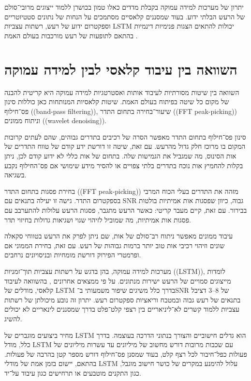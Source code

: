 יתרון של מערכות למידה עמוקה בקבלת מדדים כאלו טמון בכושרן ללמוד ייצוגים מרובי־סולם של הרעש הבלתי ידוע. בעוד שמסננים קלאסיים מסתמכים על הנחות של נתונים סטטיוטריים וספקטרום ידוע של רעש, רשתות עצביות \textenglish{LSTM} יכולות להתאים הצגות פנימיות דינמיות בהתאם לתופעות של רעש מורכבות בעולם האמת \cite{nachmani2020voice}.

\section{השוואה בין עיבוד קלאסי לבין למידה עמוקה}

השוואה בין שיטות מסורתיות לעיבוד אותות ואסטרטגיות למידה עמוקה היא קריטית להבנה של מקום כל שיטה בפיתוח בעולם האמת. שיטות קלאסיות המנותחות כאן כוללות סינון פס־חילוף ((\textenglish{band-pass filtering})), שיעור־בחירה בתחום התדר ((\textenglish{FFT peak-picking})) וניתוח ממונים ((\textenglish{wavelet denoising})).

סינון פס־חילוף בתחום התדר מאפשר הסרה של רכיבים בתדרים גבוהים, שהם לעתים קרובות המקום בו מרוכז חלק גדול מהרעש. עם זאת, שיטה זו דורשת ידע קודם של טווח התדרים של אות הסינוס, מה שמגביל את הגמישות שלה. בתחום של אות כללי לא ידוע קודם לכן, ניתן בקלות להחמיץ אות נוכח בתדרים בלתי צפויים או להסיר מידע שימושי אם פס־החילוף נקבע בשגיאה.

בחירת פסגות בתחום התדר ((\textenglish{FFT peak-picking})) מזהה את התדרים בעלי הכוח המרבי בספקטרום התדר. גישה זו יעילה בתנאים עם \textenglish{SNR} גבוה, כיוון שפסגות אות אמיתיות בולטות בבירור. עם זאת, קיים מעבר קריטי: כאשר הרעש מתגבר, פסגות הרעש עלולות להתערבב עם פסגות אות אמיתיות, מה שמוביל לזיהוי שגוי ושגיאות גדולות בחיזוי תדר.

עיבוד ממונים מאפשר ניתוח רב־סולם של אות, שם ניתן לפרק את הרעש בטווחי סקאלה שונים וזיהוי רכיבי אות טוב יותר ברמות גבוהות של רעש. עם זאת, בחירת הממוני אם ופרמטרי הפירוק דורשת מומחיות ובניסויונים נרחבים.

מערכות למידה עמוקה, בהן בדגש על רשתות עצביות תוך־זמניות ((\textenglish{LSTM})), לומדות מייצוגים סמויים של הרעש ישירות מנתונים. על פי ממצאים אחרונים \cite{tzinis2020universal}, בהשוואה לעיבוד קלאסי, מודלים של \textenglish{LSTM} בדרך כלל משיגים שיפור משמעותי ב־\textenglish{SNR} של $3\text{--}8$ דציבל בתנאים של רעש גבוה ובמטבח וריאציות ספקטרום רעש. יתרון זה נובע מיכולתן של רשתות עצביות ללמוד קשרים לא־ליניאריים בין רצפי קלט־פלט בדרך שמסננים לינאריים לא יכולים להשיג.

מחיר ביצועים מוגברים של \textenglish{LSTM} הוא גדלים חישוביים והצורך בנתוני הדרכה בעוצמה. בדרך כלל, מודל \textenglish{LSTM} עם שכבות מרובות דורש מחשוב של מיליונים עד עשרות מיליונים של פעולות כפל־חיבור לכל רצף קלט, בעוד שמסנן פס־חילוף דורש מספר קטן בהרבה של פעולות. בהתאם, יישום בזמן אמת של מודלי \textenglish{LSTM} עלול להימנע במקרים של כושר חישוב מוגבל, כגון התקנים מוטבעים או תרחישים כגון עיבוד על־יד.

